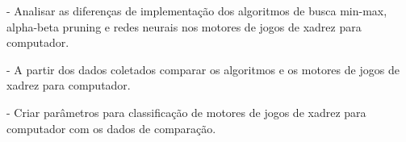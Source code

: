 - Analisar as diferenças de implementação dos algoritmos de busca min-max, alpha-beta pruning e redes neurais nos
motores de jogos de xadrez para computador.

- A partir dos dados coletados comparar os algoritmos e os motores de jogos de xadrez para computador.

- Criar parâmetros para classificação de motores de jogos de xadrez para computador com os dados de comparação.




